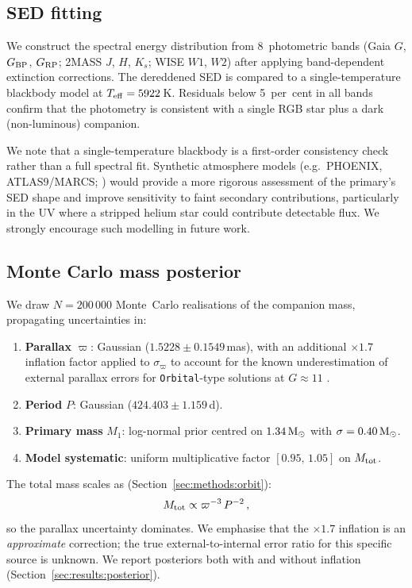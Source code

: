 \documentclass[usenatbib,fleqn]{mnras}
\newcommand{\Msun}{{\rm M}_\odot}
\begin{document}
\subsection{SED fitting}
\label{sec:methods:sed}

We construct the spectral energy distribution from 8~photometric
bands (Gaia $G$, $G_{\rm BP}$, $G_{\rm RP}$; 2MASS $J$, $H$,
$K_s$; WISE $W1$, $W2$) after applying band-dependent extinction
corrections.  The dereddened SED is compared to a single-temperature
blackbody model at $T_{\rm eff} = 5922$\,K.  Residuals below
5~per~cent in all bands confirm that the photometry is consistent
with a single RGB star plus a dark (non-luminous) companion.

We note that a single-temperature blackbody is a first-order
consistency check rather than a full spectral fit.  Synthetic
atmosphere models (e.g.\ PHOENIX, ATLAS9/MARCS;
\citealt{Husser2013,Castelli2003}) would provide a more rigorous
assessment of the primary's SED shape and improve sensitivity to
faint secondary contributions, particularly in the UV where a
stripped helium star could contribute detectable flux.  We strongly
encourage such modelling in future work.

\subsection{Monte Carlo mass posterior}
\label{sec:methods:mc}

We draw $N = 200\,000$ Monte~Carlo realisations of the companion
mass, propagating uncertainties in:
\begin{enumerate}
\item \textbf{Parallax} $\varpi$: Gaussian ($1.5228 \pm 0.1549$\,mas),
  with an additional $\times 1.7$ inflation factor applied to
  $\sigma_\varpi$ to account for the known underestimation of
  external parallax errors for \texttt{Orbital}-type solutions at
  $G \approx 11$ \citep{ElBadry2024}.
\item \textbf{Period} $P$: Gaussian ($424.403 \pm 1.159$\,d).
\item \textbf{Primary mass} $M_1$: log-normal prior centred on
  $1.34\,\Msun$ with $\sigma = 0.40\,\Msun$.
\item \textbf{Model systematic}: uniform multiplicative factor
  $[0.95,\,1.05]$ on $M_{\rm tot}$.
\end{enumerate}
The total mass scales as (Section~\ref{sec:methods:orbit}):
\begin{equation}
M_{\rm tot} \propto \varpi^{-3}\,P^{-2}\,,
\label{eq:scaling}
\end{equation}
so the parallax uncertainty dominates.  We emphasise that the
$\times 1.7$ inflation is an \emph{approximate} correction;
the true external-to-internal error ratio for this specific
source is unknown.  We report posteriors both with and without
inflation (Section~\ref{sec:results:posterior}).
\end{document}
